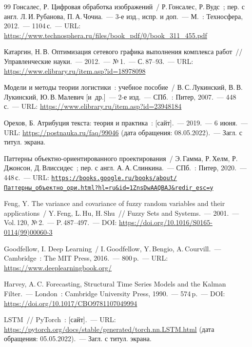 \documentclass{stud-conf-pmk}
\begin{document}
\begin{paper}
\begin{thebibliography}{99}
Гонсалес, Р. Цифровая обработка изображений~/ Р.\,Гонсалес, Р.\,Вудс~;
пер. с англ. Л.\,И.\,Рубанова, П.\,А.\,Чочиа.~--- 3-е изд., испр. и
доп.~--- М.~: Техносфера, 2012.~--- 1104\,с.~--- URL: \url{https://www.technosphera.ru/files/book_pdf/0/book_311_455.pdf}

Катаргин, Н.\,В. Оптимизация сетевого графика выполнения комплекса работ~//
Управленческие науки.~--- 2012.~--- №\,1.~--- С.\,87--93.~--- URL: \url{https://www.elibrary.ru/item.asp?id=18978098}

Модели и методы теории логистики~: учебное пособие~/ В.\,С.\,Лукинский,
В.\,В.\,Лукинский, Ю.\,В.\,Малевич [и~др.]~--- 2-е изд.~--- СПб.~: Питер,
2007.~--- 448\,с.~--- URL: \url{https://www.elibrary.ru/item.asp?id=23948184}

Орехов, Б. Атрибуция текста: теория и практика~: [сайт].~--- 2019.~---
6 июня.~--- URL: \url{https://postnauka.ru/faq/99046} (дата обращения:
08.05.2022).~--- Загл. с титул. экрана.

Паттерны объектно-ориентированного проектирования~/ Э.\,Гамма, Р.\,Хелм,
Р.\,Джонсон, Д.\,Влиссидес~; пер. с англ. А.\,А.\,Слинкина.~--- СПб.~:
Питер, 2020.~--- 448\,с.~--- URL: \href{https://books.google.ru/books/about/\%D0\%9F\%D0\%B0\%D1\%82\%D1\%82\%D0\%B5\%D1\%80\%D0\%BD\%D1\%8B_\%D0\%BE\%D0\%B1\%D1\%8A\%D0\%B5\%D0\%BA\%D1\%82\%D0\%BD\%D0\%BE_\%D0\%BE\%D1\%80\%D0\%B8.html?hl=ru&id=1ZnsDwAAQBAJ&redir_esc=y}{\texttt{https://books.google.ru/books/about/Паттерны\_объектно\_\linebreak ори.html?hl=ru\&id=1ZnsDwAAQBAJ\&redir\_esc=y}}

Feng, Y. The variance and covariance of fuzzy random variables and their
applications~/ Y.\,Feng, L.\,Hu, H.\,Shu~// Fuzzy Sets and Systems.~---
2001.~--- Vol.\,120, №\,2.~--- P.\,487--497.~--- DOI: \url{https://doi.org/10.1016/S0165-0114(99)00060-3}

Goodfellow, I. Deep Learning~/ I.\,Goodfellow, Y.\,Bengio, A.\,Courvill.~--- Cambridge~: The MIT Press, 2016.~--- 800\,p.~--- URL: \url{https://www.deeplearningbook.org/}

Harvey, A.\,C. Forecasting, Structural Time Series Models and the Kalman
Filter.~--- London~: Cambridge University Press, 1990.~--- 574\,p.~--- DOI: \url{https://doi.org/10.1017/CBO9781107049994}

LSTM~// PyTorch~: [сайт].~--- URL:
\url{https://pytorch.org/docs/stable/generated/torch.nn.LSTM.html}
(дата обращения: 05.05.2022).~--- Загл. с титул. экрана.


\end{thebibliography}
\end{paper}
\end{document}
